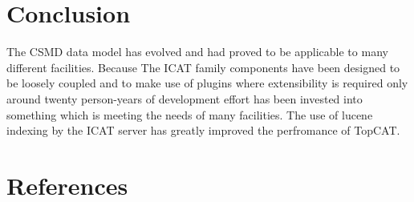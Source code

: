 \documentclass[a4paper]{jpconf}
\begin{document}
\section{Conclusion}
The CSMD data model has evolved and had proved to be applicable to
many different facilities. Because The ICAT family components have
been designed to be loosely coupled and to make use of plugins where
extensibility is required only around twenty person-years of
development effort has been invested into something which is meeting
the needs of many facilities. The use of lucene indexing by the ICAT
server has greatly improved the perfromance of TopCAT.

\section*{References}


\end{document}
